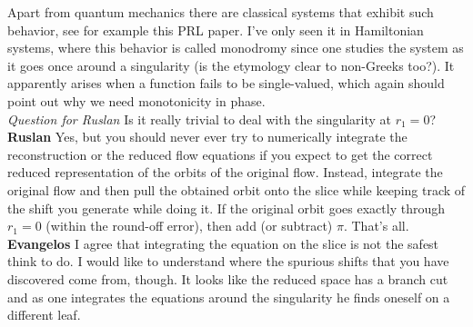  Apart from quantum mechanics there
are classical systems that exhibit such behavior, see for
example
{this PRL paper}. I've only seen it in Hamiltonian systems,
where this behavior is called monodromy since one studies the
system as it goes once around a singularity (is the etymology
clear to non-Greeks too?). It apparently arises when a
function fails to be single-valued, which again should point
out why we need monotonicity in phase.\\
\textit{Question for Ruslan} Is it really trivial to deal
with the singularity at $r_1=0$?\\
{\bf Ruslan} Yes, but you should never ever try to
numerically integrate the reconstruction or the reduced flow
equations if you expect to get the correct reduced
representation of the orbits of the original flow.  Instead,
integrate the original flow and then pull the obtained orbit
onto the slice while keeping track of the shift you generate
while doing it.  If the original orbit goes exactly through
$r_1 = 0$ (within the round-off error), then add (or
subtract) $\pi$.  That's all.\\
{\bf Evangelos}  I agree that integrating the equation on the
slice is not the safest think to do. I would like to
understand where the spurious shifts that you have discovered
come from, though. It looks like the reduced space has a
branch cut and as one integrates the equations around the
singularity he finds oneself on a different leaf.

